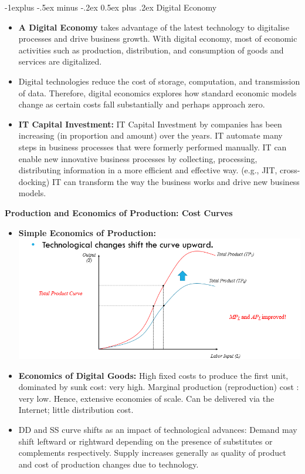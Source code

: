 \documentclass[12pt, landscape]{article}
\makeatletter
\renewcommand{\subsection}{\@startsection{subsection}{2}{0mm}%
                                {-1explus -.5ex minus -.2ex}%
                                {0.5ex plus .2ex}%
                                {\normalfont\normalsize\bfseries}}
\makeatother
\begin{document}
\begin{multicols*}{3}
\subsection{Digital Economy}
\begin{itemize}
\item \textbf{A Digital Economy} takes advantage of the latest technology to digitalise processes and drive business growth. With digital economy, most of economic activities such as production, distribution, and consumption of goods and services are digitalized.
\item Digital technologies reduce the cost of storage, computation, and transmission of data. Therefore, digital economics explores how standard economic models change as certain costs fall substantially and perhaps approach zero.
\item \textbf{IT Capital Investment:} IT Capital Investment by companies has been increasing (in proportion and amount) over the years. IT automate many steps in business processes that were formerly performed manually. IT can enable new innovative business processes by collecting, processing, distributing information in a more efficient and effective way. (e.g., JIT, cross-docking) IT can transform the way the business works and drive new business models.
\end{itemize}
\textbf{Production and Economics of Production: Cost Curves}
\begin{itemize}
\item \textbf{Simple Economics of Production:}
\includegraphics[width=0.7\linewidth]{technologicalChange}
\item \textbf{Economics of Digital Goods:} High fixed costs to produce the first unit, dominated by sunk cost: very high. Marginal production (reproduction) cost : very low. Hence, extensive economies of scale. Can be delivered via the Internet; little distribution cost.
\item DD and SS curve shifts as an impact of technological advances: Demand may shift leftward or rightward depending on the presence of substitutes or complements respectively. Supply increases generally as quality of product and cost of production changes due to technology.
\end{itemize}


\end{multicols*}
\end{document}
